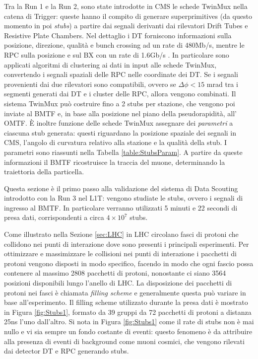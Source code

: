 Tra la Run 1 e la Run 2, sono state introdotte in CMS le schede TwinMux nella catena di Trigger: queste hanno il compito di generare superprimitives (da questo momento in poi \textit{stubs}) a partire dai segnali derivanti dai rilevatori Drift Tubes e Resistive Plate Chambers. \newline
Nel dettaglio i DT forniscono informazioni sulla posizione, direzione, qualità e bunch crossing ad un rate di 480Mb/s, mentre le RPC sulla posizione e sul BX con un rate di 1.6Gb/s \cite{CERNsummerSchool}.\newline
In particolare sono applicati algoritmi di clustering ai dati in input alle schede TwinMux, convertendo i segnali spaziali delle RPC nelle coordinate dei DT. Se i segnali provenienti dai due rilevatori sono compatibili, ovvero se $\Delta \phi < 15$ \si{mrad} tra i segmenti generati dai DT e i cluster delle RPC, allora vengono combinati.
Il sistema TwinMux può costruire fino a 2 stubs per stazione, che vengono poi inviate al BMTF e, in base alla posizione nel piano della pseudorapidità, all' OMTF. \newline
È inoltre funzione delle schede TwinMux assegnare dei \textit{parametri} a ciascuna stub generata: questi riguardano la posizione spaziale dei segnali in CMS, l'angolo di curvatura relativo alla stazione e la qualità della stub. I parametri sono riassunti nella Tabella \ref{table:StubsParam}. A partire da queste informazioni il BMTF ricostruisce la traccia del muone, determinando la traiettoria della particella. 

Questa sezione è il primo passo alla validazione del sistema di Data Scouting introdotto con la Run 3 nel L1T: vengono studiate le stubs, ovvero i segnali di ingresso al BMTF. In particolare verranno utilizzati 5 minuti e 22 secondi di presa dati, corrispondenti a circa $4 \times 10^{7}$ stubs. 

Come illustrato nella Sezione \ref{sec:LHC} in LHC circolano fasci di protoni che collidono nei punti di interazione dove sono presenti i principali esperimenti. Per ottimizzare e massimizzare le collisioni nei punti di interazione i pacchetti di protoni vengono disposti in modo specifico, facendo in modo che ogni fascio possa contenere al massimo 2808 pacchetti di protoni, nonostante ci siano 3564 posizioni disponibili lungo l'anello di LHC. La disposizione dei pacchetti di protoni nei fasci è chiamata \textit{filling scheme} e generalmente questa può variare in base all'esperimento. Il filling scheme utilizzato durante la presa dati è mostrato in Figura \ref{fig:Stubs1}, formato da 39 gruppi da 72 pacchetti di protoni a distanza 25ns l'uno dall'altro\cite{Bailey}. \newline
Si nota in Figura \ref{fig:Stubs1} come il rate di stubs non è mai nullo e vi sia sempre un fondo costante di eventi: questo fenomeno è da attribuire alla presenza di eventi di background come muoni cosmici, che vengono rilevati dai detector DT e RPC generando stubs. 



